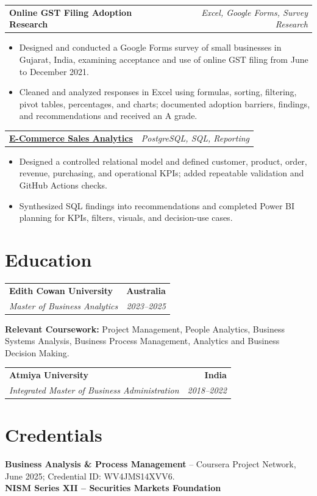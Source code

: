 \documentclass[letterpaper,10pt]{article}
\makeatletter
\newcommand{\role}[4]{%
  \begin{tabularx}{\textwidth}{@{}Xr@{}}
    \textbf{#1} & \textbf{#2} \\
    \textit{#3} & \textit{#4}
  \end{tabularx}\vspace{-1pt}
}
\newcommand{\project}[2]{%
  \begin{tabularx}{\textwidth}{@{}Xr@{}}
    \textbf{#1} & \textit{#2}
  \end{tabularx}\vspace{-1pt}
}
\makeatother
\begin{document}
\project{Online GST Filing Adoption Research}{Excel, Google Forms, Survey Research}
\begin{itemize}
  \item Designed and conducted a Google Forms survey of small businesses in Gujarat, India, examining acceptance and use of online GST filing from June to December 2021.
  \item Cleaned and analyzed responses in Excel using formulas, sorting, filtering, pivot tables, percentages, and charts; documented adoption barriers, findings, and recommendations and received an A grade.
\end{itemize}
\vspace{1pt}

\project{\href{https://github.com/jainalimehta/Ecommerce-Sales-Analytics}{E-Commerce Sales Analytics}}{PostgreSQL, SQL, Reporting}
\begin{itemize}
  \item Designed a controlled relational model and defined customer, product, order, revenue, purchasing, and operational KPIs; added repeatable validation and GitHub Actions checks.
  \item Synthesized SQL findings into recommendations and completed Power BI planning for KPIs, filters, visuals, and decision-use cases.
\end{itemize}

\section{Education}
\role{Edith Cowan University}{Australia}{Master of Business Analytics}{2023--2025}
\small\textbf{Relevant Coursework:} Project Management, People Analytics, Business Systems Analysis, Business Process Management, Analytics and Business Decision Making.\\[2pt]
\role{Atmiya University}{India}{Integrated Master of Business Administration}{2018--2022}

\section{Credentials}
\small\textbf{Business Analysis \& Process Management} -- Coursera Project Network, June 2025; Credential ID: WV4JMS14XVV6.\\[-0.2pt]
\small\textbf{NISM Series XII -- Securities Markets Foundation}
\end{document}
